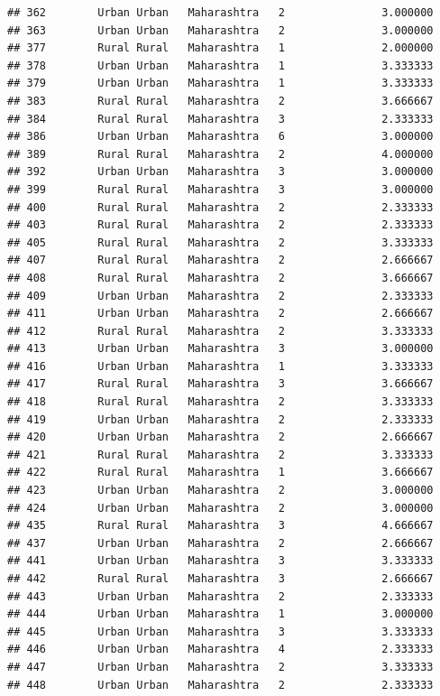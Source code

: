 \documentclass[
]{article}
\begin{document}
\begin{verbatim}
## 362        Urban Urban   Maharashtra   2               3.000000
## 363        Urban Urban   Maharashtra   2               3.000000
## 377        Rural Rural   Maharashtra   1               2.000000
## 378        Urban Urban   Maharashtra   1               3.333333
## 379        Urban Urban   Maharashtra   1               3.333333
## 383        Rural Rural   Maharashtra   2               3.666667
## 384        Rural Rural   Maharashtra   3               2.333333
## 386        Urban Urban   Maharashtra   6               3.000000
## 389        Rural Rural   Maharashtra   2               4.000000
## 392        Urban Urban   Maharashtra   3               3.000000
## 399        Rural Rural   Maharashtra   3               3.000000
## 400        Rural Rural   Maharashtra   2               2.333333
## 403        Rural Rural   Maharashtra   2               2.333333
## 405        Rural Rural   Maharashtra   2               3.333333
## 407        Rural Rural   Maharashtra   2               2.666667
## 408        Rural Rural   Maharashtra   2               3.666667
## 409        Urban Urban   Maharashtra   2               2.333333
## 411        Urban Urban   Maharashtra   2               2.666667
## 412        Rural Rural   Maharashtra   2               3.333333
## 413        Urban Urban   Maharashtra   3               3.000000
## 416        Urban Urban   Maharashtra   1               3.333333
## 417        Rural Rural   Maharashtra   3               3.666667
## 418        Rural Rural   Maharashtra   2               3.333333
## 419        Urban Urban   Maharashtra   2               2.333333
## 420        Urban Urban   Maharashtra   2               2.666667
## 421        Rural Rural   Maharashtra   2               3.333333
## 422        Rural Rural   Maharashtra   1               3.666667
## 423        Urban Urban   Maharashtra   2               3.000000
## 424        Urban Urban   Maharashtra   2               3.000000
## 435        Rural Rural   Maharashtra   3               4.666667
## 437        Urban Urban   Maharashtra   2               2.666667
## 441        Urban Urban   Maharashtra   3               3.333333
## 442        Rural Rural   Maharashtra   3               2.666667
## 443        Urban Urban   Maharashtra   2               2.333333
## 444        Urban Urban   Maharashtra   1               3.000000
## 445        Urban Urban   Maharashtra   3               3.333333
## 446        Urban Urban   Maharashtra   4               2.333333
## 447        Urban Urban   Maharashtra   2               3.333333
## 448        Urban Urban   Maharashtra   2               2.333333

\end{verbatim}
\end{document}
